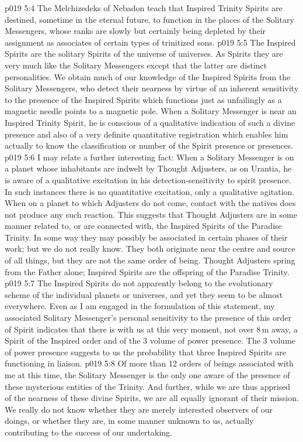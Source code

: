 \vs p019 5:4 The Melchizedeks of Nebadon teach that Inspired Trinity Spirits are destined, sometime in the eternal future, to function in the places of the Solitary Messengers, whose ranks are slowly but certainly being depleted by their assignment as associates of certain types of trinitized sons.
\vs p019 5:5 \pc The Inspired Spirits are the solitary Spirits of the universe of universes. As Spirits they are very much like the Solitary Messengers except that the latter are distinct personalities. We obtain much of our knowledge of the Inspired Spirits from the Solitary Messengers, who detect their nearness by virtue of an inherent sensitivity to the presence of the Inspired Spirits which functions just as unfailingly as a magnetic needle points to a magnetic pole. When a Solitary Messenger is near an Inspired Trinity Spirit, he is conscious of a qualitative indication of such a divine presence and also of a very definite quantitative registration which enables him actually to know the classification or number of the Spirit presence or presences.
\vs p019 5:6 I may relate a further interesting fact: When a Solitary Messenger is on a planet whose inhabitants are indwelt by Thought Adjusters, as on Urantia, he is aware of a qualitative excitation in his detection\hyp{}sensitivity to spirit presence. In such instances there is no quantitative excitation, only a qualitative agitation. When on a planet to which Adjusters do not come, contact with the natives does not produce any such reaction. This suggests that Thought Adjusters are in some manner related to, or are connected with, the Inspired Spirits of the Paradise Trinity. In some way they may possibly be associated in certain phases of their work; but we do not really know. They both originate near the centre and source of all things, but they are not the same order of being. Thought Adjusters spring from the Father alone; Inspired Spirits are the offspring of the Paradise Trinity.
\vs p019 5:7 The Inspired Spirits do not apparently belong to the evolutionary scheme of the individual planets or universes, and yet they seem to be almost everywhere. Even as I am engaged in the formulation of this statement, my associated Solitary Messenger’s personal sensitivity to the presence of this order of Spirit indicates that there is with us at this very moment, not over 8\,m away, a Spirit of the Inspired order and of the 3 volume of power presence. The 3 volume of power presence suggests to us the probability that three Inspired Spirits are functioning in liaison.
\vs p019 5:8 \pc Of more than 12 orders of beings associated with me at this time, the Solitary Messenger is the only one aware of the presence of these mysterious entities of the Trinity. And further, while we are thus apprised of the nearness of these divine Spirits, we are all equally ignorant of their mission. We really do not know whether they are merely interested observers of our doings, or whether they are, in some manner unknown to us, actually contributing to the success of our undertaking.

